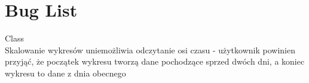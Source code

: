 \chapter{Bug List}
\hypertarget{bug}{}\label{bug}

\begin{DoxyRefList}
\item[Class \doxylink{class_weather_app}{Weather\+App} ]\hfill \\
\label{bug__bug000001}%
%
Skalowanie wykresów uniemożliwia odczytanie osi czasu -\/ użytkownik powinien przyjąć, że początek wykresu tworzą dane pochodzące sprzed dwóch dni, a koniec wykresu to dane z dnia obecnego 
\end{DoxyRefList}